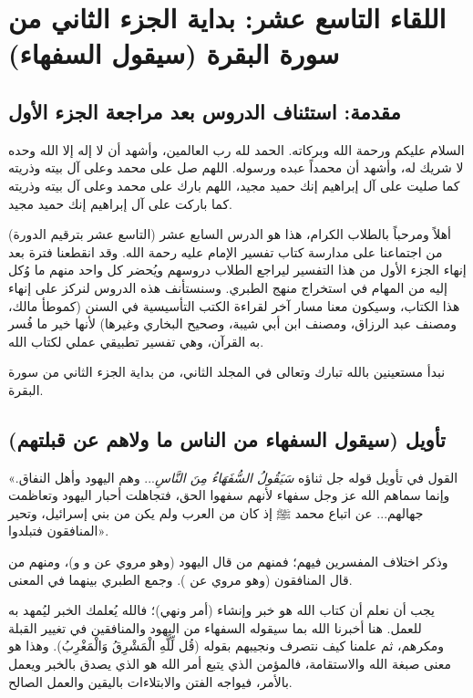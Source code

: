 \chapter{اللقاء التاسع عشر: بداية الجزء الثاني من سورة البقرة (سيقول السفهاء)}

\section{مقدمة: استئناف الدروس بعد مراجعة الجزء الأول}
السلام عليكم ورحمة الله وبركاته. الحمد لله رب العالمين، وأشهد أن لا إله إلا الله وحده لا شريك له، وأشهد أن محمداً عبده ورسوله. اللهم صل على محمد وعلى آل بيته وذريته كما صليت على آل إبراهيم إنك حميد مجيد، اللهم بارك على محمد وعلى آل بيته وذريته كما باركت على آل إبراهيم إنك حميد مجيد.

أهلاً ومرحباً بالطلاب الكرام، هذا هو الدرس السابع عشر (التاسع عشر بترقيم الدورة) من اجتماعنا على مدارسة كتاب تفسير الإمام  عليه رحمة الله. وقد انقطعنا فترة بعد إنهاء الجزء الأول من هذا التفسير ليراجع الطلاب دروسهم ويُحضر كل واحد منهم ما وُكل إليه من المهام في استخراج منهج الطبري. وسنستأنف هذه الدروس لنركز على إنهاء هذا الكتاب، وسيكون معنا مسار آخر لقراءة الكتب التأسيسية في السنن (كموطأ مالك، ومصنف عبد الرزاق، ومصنف ابن أبي شيبة، وصحيح البخاري وغيرها) لأنها خير ما فُسر به القرآن، وهي تفسير تطبيقي عملي لكتاب الله.

نبدأ مستعينين بالله تبارك وتعالى في المجلد الثاني، من بداية الجزء الثاني من سورة البقرة.

\separator

\section{تأويل (سيقول السفهاء من الناس ما ولاهم عن قبلتهم)}
 «القول في تأويل قوله جل ثناؤه \textit{سَيَقُولُ السُّفَهَاءُ مِنَ النَّاسِ}... وهم اليهود وأهل النفاق. وإنما سماهم الله عز وجل سفهاء لأنهم سفهوا الحق، فتجاهلت أحبار اليهود وتعاظمت جهالهم... عن اتباع محمد ﷺ إذ كان من العرب ولم يكن من بني إسرائيل، وتحير المنافقون فتبلدوا».

وذكر  اختلاف المفسرين فيهم؛ فمنهم من قال اليهود (وهو مروي عن  و و)، ومنهم من قال المنافقون (وهو مروي عن ). وجمع الطبري بينهما في المعنى.

\begin{fawaid}
يجب أن نعلم أن كتاب الله هو خبر وإنشاء (أمر ونهي)؛ فالله يُعلمك الخبر ليُمهد به للعمل. هنا أخبرنا الله بما سيقوله السفهاء من اليهود والمنافقين في تغيير القبلة ومكرهم، ثم علمنا كيف نتصرف ونجيبهم بقوله (قُل لِّلَّهِ الْمَشْرِقُ وَالْمَغْرِبُ). وهذا هو معنى صبغة الله والاستقامة، فالمؤمن الذي يتبع أمر الله هو الذي يصدق بالخبر ويعمل بالأمر، فيواجه الفتن والابتلاءات باليقين والعمل الصالح.
\end{fawaid}

